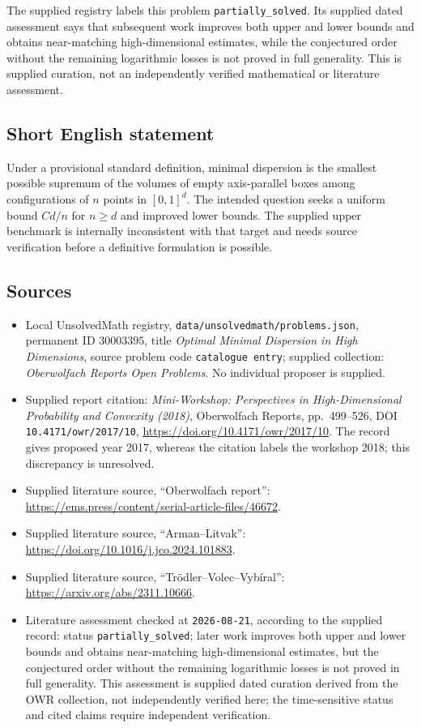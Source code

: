 \documentclass[11pt]{article}
\begin{document}
The supplied registry labels this problem \texttt{partially\_solved}. Its supplied dated assessment says that subsequent work improves both upper and lower bounds and obtains near-matching high-dimensional estimates, while the conjectured order without the remaining logarithmic losses is not proved in full generality. This is supplied curation, not an independently verified mathematical or literature assessment.
\subsection{Short English statement}
Under a provisional standard definition, minimal dispersion is the smallest possible supremum of the volumes of empty axis-parallel boxes among configurations of \(n\) points in \([0,1]^d\). The intended question seeks a uniform bound \(Cd/n\) for \(n\geq d\) and improved lower bounds. The supplied upper benchmark is internally inconsistent with that target and needs source verification before a definitive formulation is possible.
\subsection{Sources}
\begin{itemize}
\item Local UnsolvedMath registry, \texttt{data/unsolvedmath/problems.json}, permanent ID \(30003395\), title \emph{Optimal Minimal Dispersion in High Dimensions}, source problem code \texttt{catalogue entry}; supplied collection: \emph{Oberwolfach Reports Open Problems}. No individual proposer is supplied.
\item Supplied report citation: \emph{Mini-Workshop: Perspectives in High-Dimensional Probability and Convexity (2018)}, Oberwolfach Reports, pp.\ 499--526, DOI \texttt{10.4171/owr/2017/10}, \url{https://doi.org/10.4171/owr/2017/10}. The record gives proposed year 2017, whereas the citation labels the workshop 2018; this discrepancy is unresolved.
\item Supplied literature source, ``Oberwolfach report'': \url{https://ems.press/content/serial-article-files/46672}.
\item Supplied literature source, ``Arman--Litvak'': \url{https://doi.org/10.1016/j.jco.2024.101883}.
\item Supplied literature source, ``Trödler--Volec--Vybíral'': \url{https://arxiv.org/abs/2311.10666}.
\item Literature assessment checked at \texttt{2026-08-21}, according to the supplied record: status \texttt{partially\_solved}; later work improves both upper and lower bounds and obtains near-matching high-dimensional estimates, but the conjectured order without the remaining logarithmic losses is not proved in full generality. This assessment is supplied dated curation derived from the OWR collection, not independently verified here; the time-sensitive status and cited claims require independent verification.
\end{itemize}
\end{document}
